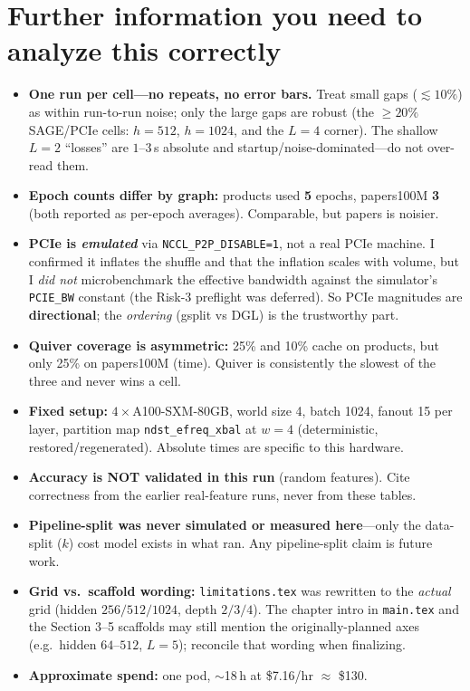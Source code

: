 \section*{Further information you need to analyze this correctly}
\begin{itemize}
\item \textbf{One run per cell---no repeats, no error bars.} Treat small gaps
($\lesssim 10\%$) as within run-to-run noise; only the large gaps are robust (the
$\ge 20\%$ SAGE/PCIe cells: $h{=}512$, $h{=}1024$, and the $L{=}4$ corner). The shallow
$L{=}2$ ``losses'' are $1$--$3$\,s absolute and startup/noise-dominated---do not over-read
them.
\item \textbf{Epoch counts differ by graph:} products used \textbf{5} epochs, papers100M
\textbf{3} (both reported as per-epoch averages). Comparable, but papers is noisier.
\item \textbf{PCIe is \emph{emulated}} via \texttt{NCCL\_P2P\_DISABLE=1}, not a real PCIe
machine. I confirmed it inflates the shuffle and that the inflation scales with volume,
but I \emph{did not} microbenchmark the effective bandwidth against the simulator's
\texttt{PCIE\_BW} constant (the Risk-3 preflight was deferred). So PCIe magnitudes are
\textbf{directional}; the \emph{ordering} (gsplit vs DGL) is the trustworthy part.
\item \textbf{Quiver coverage is asymmetric:} 25\% and 10\% cache on products, but only
25\% on papers100M (time). Quiver is consistently the slowest of the three and never wins
a cell.
\item \textbf{Fixed setup:} $4\times$A100-SXM-80GB, world size 4, batch 1024, fanout 15
per layer, partition map \texttt{ndst\_efreq\_xbal} at $w{=}4$ (deterministic,
restored/regenerated). Absolute times are specific to this hardware.
\item \textbf{Accuracy is NOT validated in this run} (random features). Cite correctness
from the earlier real-feature runs, never from these tables.
\item \textbf{Pipeline-split was never simulated or measured here}---only the data-split
($k$) cost model exists in what ran. Any pipeline-split claim is future work.
\item \textbf{Grid vs.\ scaffold wording:} \texttt{limitations.tex} was rewritten to the
\emph{actual} grid (hidden $256/512/1024$, depth $2/3/4$). The chapter intro in
\texttt{main.tex} and the Section 3--5 scaffolds may still mention the originally-planned
axes (e.g.\ hidden $64$--$512$, $L{=}5$); reconcile that wording when finalizing.
\item \textbf{Approximate spend:} one pod, $\sim$18\,h at \$7.16/hr $\approx$ \$130.
\end{itemize}


